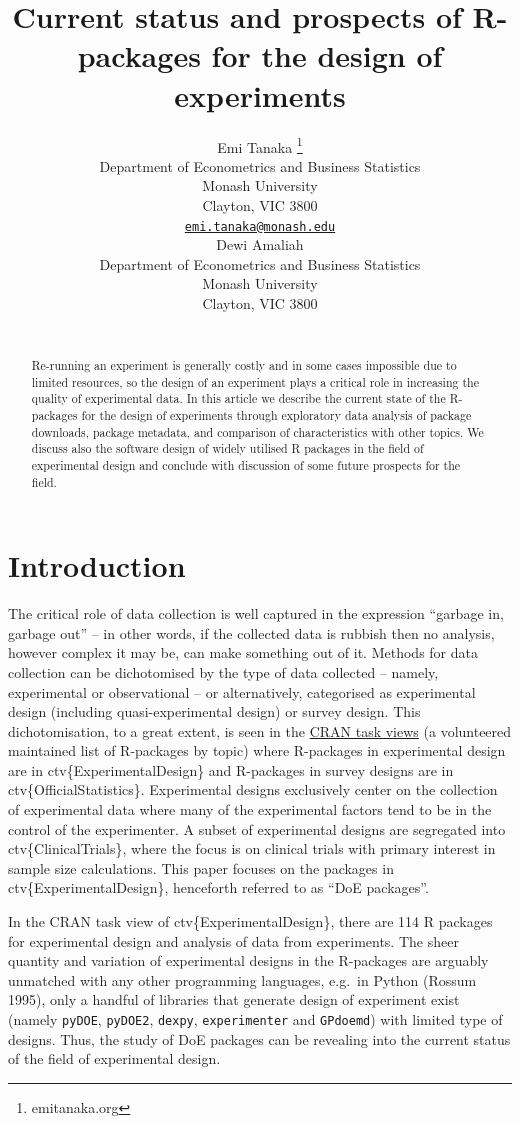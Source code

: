 \documentclass{article}
\title{Current status and prospects of R-packages for the design of
experiments}
\author{
    Emi Tanaka
    \thanks{emitanaka.org}
   \\
    Department of Econometrics and Business Statistics \\
    Monash University \\
  Clayton, VIC 3800 \\
  \texttt{\href{mailto:emi.tanaka@monash.edu}{\nolinkurl{emi.tanaka@monash.edu}}} \\
   \And
    Dewi Amaliah
   \\
    Department of Econometrics and Business Statistics \\
    Monash University \\
  Clayton, VIC 3800 \\
  \texttt{} \\
  }
\begin{document}
\maketitle


\begin{abstract}
Re-running an experiment is generally costly and in some cases
impossible due to limited resources, so the design of an experiment
plays a critical role in increasing the quality of experimental data. In
this article we describe the current state of the R-packages for the
design of experiments through exploratory data analysis of package
downloads, package metadata, and comparison of characteristics with
other topics. We discuss also the software design of widely utilised R
packages in the field of experimental design and conclude with
discussion of some future prospects for the field.
\end{abstract}


\hypertarget{introduction}{%
\section{Introduction}\label{introduction}}

The critical role of data collection is well captured in the expression
``garbage in, garbage out'' -- in other words, if the collected data is
rubbish then no analysis, however complex it may be, can make something
out of it. Methods for data collection can be dichotomised by the type
of data collected -- namely, experimental or observational -- or
alternatively, categorised as experimental design (including
quasi-experimental design) or survey design. This dichotomisation, to a
great extent, is seen in the
\href{https://cran.r-project.org/web/views/}{CRAN task views} (a
volunteered maintained list of R-packages by topic) where R-packages in
experimental design are in ctv\{ExperimentalDesign\} and R-packages in
survey designs are in ctv\{OfficialStatistics\}. Experimental designs
exclusively center on the collection of experimental data where many of
the experimental factors tend to be in the control of the experimenter.
A subset of experimental designs are segregated into
ctv\{ClinicalTrials\}, where the focus is on clinical trials with
primary interest in sample size calculations. This paper focuses on the
packages in ctv\{ExperimentalDesign\}, henceforth referred to as ``DoE
packages''.

In the CRAN task view of ctv\{ExperimentalDesign\}, there are 114 R
packages for experimental design and analysis of data from experiments.
The sheer quantity and variation of experimental designs in the
R-packages are arguably unmatched with any other programming languages,
e.g.~in Python (Rossum 1995), only a handful of libraries that generate
design of experiment exist (namely \texttt{pyDOE}, \texttt{pyDOE2},
\texttt{dexpy}, \texttt{experimenter} and \texttt{GPdoemd}) with limited
type of designs. Thus, the study of DoE packages can be revealing into
the current status of the field of experimental design.
\end{document}
